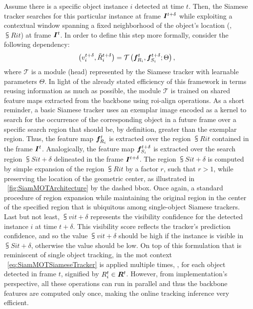 Assume there is a specific object instance $i$ detected at time $t$. Then, the Siamese tracker searches for this particular instance at frame $\bm{I}^{t + \delta}$ while exploiting a contextual window spanning a fixed neighborhood of the object's location (\ietext{}, $\subsup{R}{i}{t}$) at frame $\bm{I}^{t}$. In order to define this step more formally, consider the following dependency:
\begin{equation}
    \label{eq:SiamMOTSiameseTracker}
    \left( {
        {v}_{i}^{t + \delta},
        {\tilde{R}}_{i}^{t + \delta}
    } \right) =
    {\mathcal{T}} \left( 
        \bm{f}_{R_i}^{t}, \bm{f}_{S_i}^{t + \delta}; \Theta
     \right),
\end{equation}
where $\mathcal{T}$ is a module (head) represented by the Siamese tracker with learnable parameters $\Theta$. In light of the already stated efficiency of this framework in terms reusing information as much as possible, the module $\mathcal{T}$ is trained on shared feature maps extracted from the backbone using \gls{roi}-align operations. As a short reminder, a basic Siamese tracker uses an exemplar image encoded as a kernel to search for the occurrence of the corresponding object in a future frame over a specific search region that should be, by definition, greater than the exemplar region. Thus, the feature map $\bm{f}_{R_i}^{t}$ is extracted over the region $\subsup{R}{i}{t}$ contained in the frame $\bm{I}^{t}$. Analogically, the feature map $\bm{f}_{S_i}^{t + \delta}$ is extracted over the search region $\subsup{S}{i}{t + \delta}$ delineated in the frame $\bm{I}^{t + \delta}$. The region $\subsup{S}{i}{t + \delta}$ is computed by simple expansion of the region $\subsup{R}{i}{t}$ by a factor $r$, such that $r > 1$, while preserving the location of the geometric center, as illustrated in \figtext{}~\ref{fig:SiamMOTArchitecture} by the dashed \gls{bbox}. Once again, a standard procedure of region expansion while maintaining the original region in the center of the specified region that is ubiquitous among single-object Siamese trackers. Last but not least, $\subsup{v}{i}{t + \delta}$ represents the visibility confidence for the detected instance $i$ at time $t + \delta$. This visibility score reflects the tracker's prediction confidence, and so the value $\subsup{v}{i}{t + \delta}$ should be high if the instance is visible in $\subsup{S}{i}{t + \delta}$, otherwise the value should be low. On top of this formulation that is reminiscent of single object tracking, in the \gls{mot} context \eqtext{}~\ref{eq:SiamMOTSiameseTracker} is applied multiple times, \ietext{}, for each object detected in frame $t$, signified by ${R}_{i}^{t} \in \bm{R}^{t}$. However, from implementation's perspective, all these operations can run in parallel and thus the backbone features are computed only once, making the online tracking inference very efficient.

